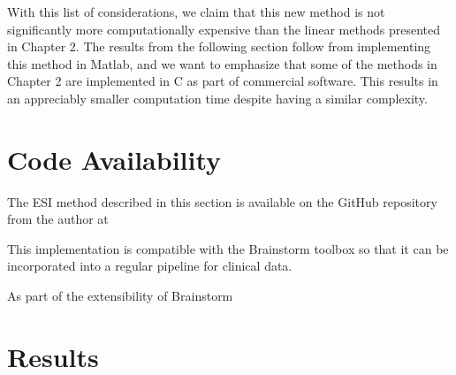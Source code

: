With this list of considerations, we claim that this new method is not significantly more computationally expensive than the linear methods presented in Chapter 2.
%
The results from the following section follow from implementing this method in Matlab, and we want to emphasize that some of the methods in Chapter 2 are implemented in C as part of commercial software.
%
This results in an appreciably smaller computation time despite having a similar complexity.

\section{Code Availability}

The ESI method described in this section is available on the GitHub repository from the author at 

This implementation is compatible with the Brainstorm toolbox \cite{brainstorm} so that it can be incorporated into a regular pipeline for clinical data.

As part of the extensibility of Brainstorm 

\section{Results}

